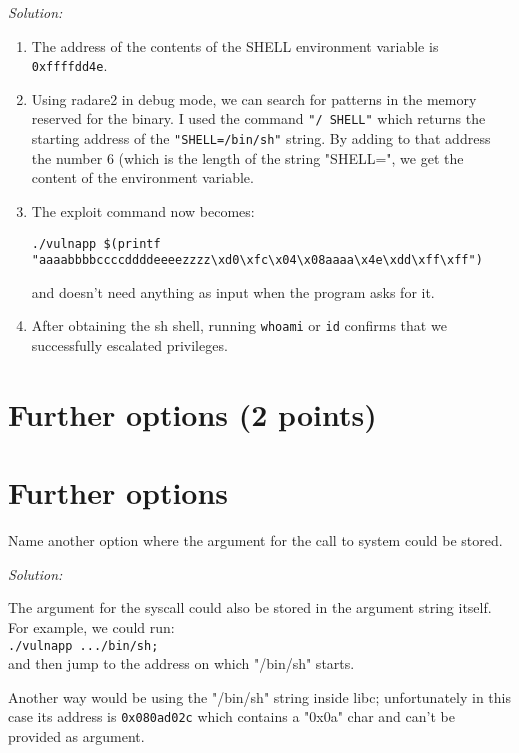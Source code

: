 \documentclass[a4paper,11pt]{article}
\newenvironment{solution}%
{\par{\noindent\small\textit{Solution:}}\vspace{-12pt}\begin{framed}}%
{\end{framed}\par}
\begin{document}
\ifsolution\begin{solution}

\begin{enumerate}
	\item The address of the contents of the SHELL environment variable is \texttt{0xffffdd4e}.
  \item Using radare2 in debug mode, we can search for patterns in the memory reserved for the binary.
	  I used the command \texttt{"/ SHELL"} which returns the starting address of the \texttt{"SHELL=/bin/sh"}
		string. By adding to that address the number 6 (which is the length of the string "SHELL=", we get the content
		of the environment variable.
  \item The exploit command now becomes:

	  \verb|./vulnapp $(printf "aaaabbbbccccddddeeeezzzz\xd0\xfc\x04\x08aaaa\x4e\xdd\xff\xff")|

		and doesn't need anything as input when the program asks for it.

	\item After obtaining the sh shell, running \texttt{whoami} or \texttt{id} confirms that we successfully escalated privileges.
\end{enumerate}


\end{solution}\fi

\ifsolution 
\section*{Further options (2 points)}
\else
\section*{Further options}
\fi

Name another option where the argument for the call to system could be stored.
\ifsolution\begin{solution}
The argument for the syscall could also be stored in the argument string itself.
For example, we could run:\\
\verb|./vulnapp .../bin/sh;|\\
and then jump to the address on which "/bin/sh" starts.

Another way would be using the "/bin/sh" string inside libc; unfortunately in this case
	its address is \texttt{0x080ad02c} which contains a "0x0a" char and can't be provided as argument.
\end{solution}\fi
\end{document}
